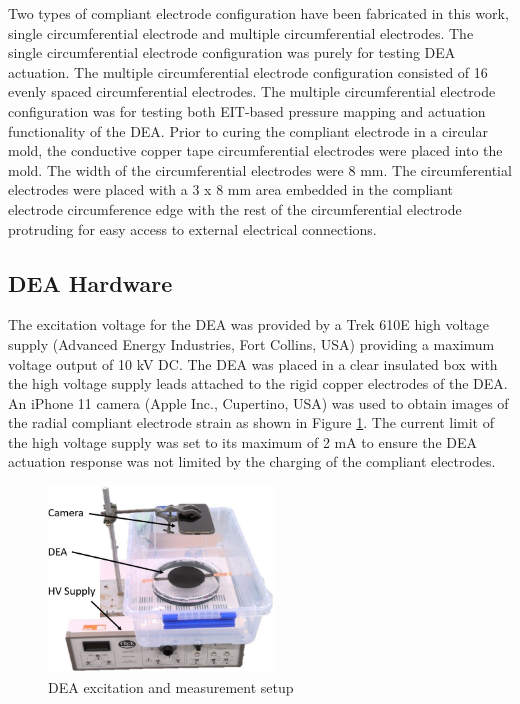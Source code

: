 Two types of compliant electrode configuration have been fabricated in this work, single circumferential electrode and multiple circumferential electrodes. The single circumferential electrode configuration was purely for testing DEA actuation. The multiple circumferential electrode configuration consisted of 16 evenly spaced circumferential electrodes. The multiple circumferential electrode configuration was for testing both EIT-based pressure mapping and actuation functionality of the DEA. Prior to curing the compliant electrode in a circular mold, the conductive copper tape circumferential electrodes were placed into the mold. The width of the circumferential electrodes were 8 mm. The circumferential electrodes were placed with a 3 x 8 mm area embedded in the compliant electrode circumference edge with the rest of the circumferential electrode protruding for easy access to external electrical connections.


\subsection{DEA Hardware}
\label{subsec:dea_hw}
The excitation voltage for the DEA was provided by a Trek 610E high voltage supply (Advanced Energy Industries, Fort Collins, USA) providing a maximum voltage output of 10 kV DC. The DEA was placed in a clear insulated box with the high voltage supply leads attached to the rigid copper electrodes of the DEA. An iPhone 11 camera (Apple Inc., Cupertino, USA) was used to obtain images of the radial compliant electrode strain as shown in Figure \ref{fig:HV_DEA_setup}. The current limit of the high voltage supply was set to its maximum of 2 mA to ensure the DEA actuation response was not limited by the charging of the compliant electrodes.
\begin{figure}[H]
	\centering
	\includegraphics[width=6cm]{Figures/HV_DEA_setup_labelled.jpg}
	\vspace{0.2cm}
	\caption{DEA excitation and measurement setup}
	\label{fig:HV_DEA_setup}
\end{figure}


